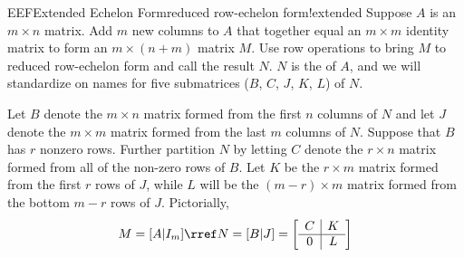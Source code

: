 \begin{definition}{EEF}{Extended Echelon Form}{reduced row-echelon form!extended}
Suppose $A$ is an $m\times n$ matrix.  Add $m$ new columns to $A$ that together equal an $m\times m$ identity matrix to form an $m\times(n+m)$ matrix $M$.  Use row operations to bring $M$ to reduced row-echelon form and call the result $N$.  $N$ is the  of $A$, and we will standardize on names for five submatrices ($B$, $C$, $J$, $K$, $L$) of $N$.\par
%
Let $B$ denote the $m\times n$ matrix formed from the first $n$ columns of $N$ and let $J$ denote the $m\times m$ matrix formed from the last $m$ columns of $N$.  Suppose that $B$ has $r$ nonzero rows.  Further partition $N$ by letting $C$ denote the $r\times n$ matrix formed from all of the non-zero rows of $B$.  Let $K$ be the $r\times m$ matrix formed from the first $r$ rows of $J$, while $L$ will be the $(m-r)\times m$ matrix formed from the bottom $m-r$ rows of $J$.  Pictorially,
%
\begin{equation*}
M=[A\vert I_m]
\rref
N=[B\vert J]
=
\left[\begin{array}{c|c}C&K\\\hline 0&L\end{array}\right]
\end{equation*}
%
\end{definition}
%
%
